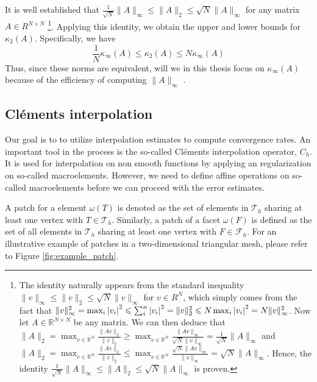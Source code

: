 It is well established that $ \frac{1}{\sqrt{N} }  \| A \|_{ \infty }^{  }  \le \| A \|_{2  }^{  } \le
\sqrt{N}  \| A \|_{\infty  }^{  }  $ for any matrix $A \in R^{N\times N}$  \footnote{
    The identity naturally appears from the standard inequality $\| v \|_{ \infty }^{  } \le  \| v \|_{2  }^{  } \le \sqrt{N}  \| v \|_{ \infty }^{  }   $ for $v \in R^{N}$, which simply comes from the fact that  $ \| v \|_{\infty  }^{ 2 } = \max_{i} \left\lvert  v_{i}  \right\rvert^{2} \leqslant \sum_{i}^{n}   \left\lvert  v_{i}  \right\rvert^{2} = \| v \|_{ 2 }^{2  } \leqslant N      \max_{i} \left\lvert  v_{i}  \right\rvert^{2} = N \| v \|_{
    \infty}^{ 2 }$. Now let $A\in \mathbb{R} ^{N \times N}$ be any matrix. We can then deduce that $ \| A \|_{ 2 }^{  } = \max_{v \in \mathbb{R} ^{N}} \frac{\| Av \|_{2  }^{  }}{\| v \|_{ 2 }^{  } } \ge \max_{v \in \mathbb{R} ^{N}}
    \frac{\| Av \|_{ \infty  }^{  }}{ \sqrt{N} \| v \|_{ \infty}^{  } } = \frac{1}{ \sqrt{N} } \| A \|_{ \infty }^{  }    $ and $ \| A \|_{ 2 }^{  } = \max_{v \in \mathbb{R} ^{N}} \frac{\| Av \|_{2  }^{  }}{\| v \|_{ 2 }^{  } } \le  \max_{v \in \mathbb{R} ^{N}}
    \frac{\sqrt{N} \| Av \|_{ \infty  }^{  }}{  \| v \|_{ \infty}^{  } } =  \sqrt{N} \| A \|_{ \infty }^{  }    $. Hence, the identity $\frac{1}{\sqrt{N} } \| A \|_{\infty  }^{  } \le \| A \|_{ 2 }^{  }\le \sqrt{N} \| A \|_{ \infty  }^{  }   $  is proven.

}. Applying this identity, we obtain the upper and lower bounds for $\kappa_{2}(A)$. Specifically, we have
\begin{equation}
\frac{1}{N} \kappa_{\infty} ( A) \le  \kappa_{2} ( A) \le N \kappa _{\infty}(A)
\end{equation}
Thus, since these norms are equivalent, will we in this thesis focus on $ \kappa_{\infty}( A)  $ because of the efficiency of computing $\| A \|_{ \infty }^{  } $  .

\subsection{Cléments interpolation}%
\label{ssub:clement_operator}
Our goal is to to utilize interpolation estimates to compute convergence rates. An important tool in the process is the so-called Cléments interpolation operator, $C_{h}$.
It is used for interpolation on non smooth functions by applying an regularization on so-called macroelements. However, we need to define affine operations on so-called macroelements before we can proceed with the error estimates.

A patch for a element $\omega \left( T \right) $ is denoted as the set of elements in $\mathcal{T} _{h}$  sharing at least one vertex with $T \in \mathcal{T} _{h}$. Similarly,  a patch of a facet $\omega \left( F \right) $ is defined as the set of all elements in $\mathcal{T}_{h} $
sharing at least one vertex with $F \in  \mathcal{F} _{h}$. For an illustrative example of patches in a two-dimensional triangular mesh, please refer to Figure \ref{fig:example_patch}.

